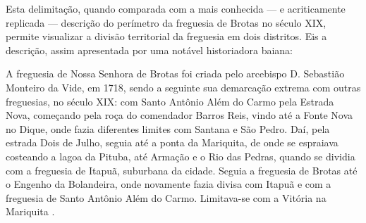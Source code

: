 Esta delimitação, quando comparada com a mais conhecida --- e acriticamente replicada --- descrição do perímetro da freguesia de Brotas no século XIX, permite visualizar a divisão territorial da freguesia em dois distritos. Eis a descrição, assim apresentada por uma notável historiadora baiana:

\begin{citacao}\label{nascimentodescreve}
A freguesia de Nossa Senhora de Brotas foi criada pelo arcebispo D. Sebastião Monteiro da Vide, em 1718, sendo a seguinte sua demarcação extrema com outras freguesias, no século XIX: com Santo Antônio Além do Carmo pela Estrada Nova, começando pela roça do comendador Barros Reis, vindo até a Fonte Nova no Dique, onde fazia diferentes limites com Santana e São Pedro. Daí, pela estrada Dois de Julho, seguia até a ponta da Mariquita, de onde se espraiava costeando a lagoa da Pituba, até Armação e o Rio das Pedras, quando se dividia com a freguesia de Itapuã, suburbana da cidade. Seguia a freguesia de Brotas até o Engenho da Bolandeira, onde novamente fazia divisa com Itapuã e com a freguesia de Santo Antônio Além do Carmo. Limitava-se com a Vitória na Mariquita \cite[p.~58]{NASCIMENTO2007}.
\end{citacao}

